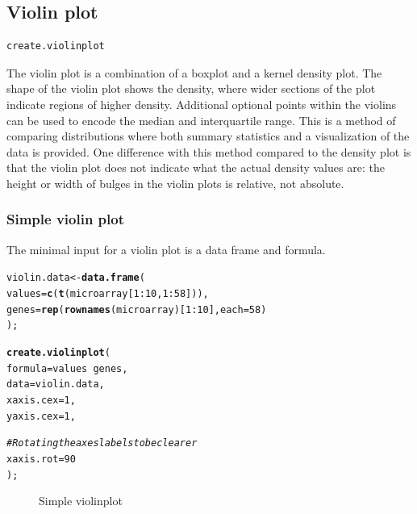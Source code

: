 \documentclass[letterpaper]{article}\usepackage[]{graphicx}\usepackage[]{color}
\makeatletter
\newcommand{\hlnum}[1]{\textcolor[rgb]{0.686,0.059,0.569}{#1}}%
\newcommand{\hlcom}[1]{\textcolor[rgb]{0.678,0.584,0.686}{\textit{#1}}}%
\newcommand{\hlopt}[1]{\textcolor[rgb]{0,0,0}{#1}}%
\newcommand{\hlstd}[1]{\textcolor[rgb]{0.345,0.345,0.345}{#1}}%
\newcommand{\hlkwb}[1]{\textcolor[rgb]{0.69,0.353,0.396}{#1}}%
\newcommand{\hlkwc}[1]{\textcolor[rgb]{0.333,0.667,0.333}{#1}}%
\newcommand{\hlkwd}[1]{\textcolor[rgb]{0.737,0.353,0.396}{\textbf{#1}}}%
\newenvironment{kframe}{%
 \def\at@end@of@kframe{}%
 \ifinner\ifhmode%
  \def\at@end@of@kframe{\end{minipage}}%
  \begin{minipage}{\columnwidth}%
 \fi\fi%
 \def\FrameCommand##1{\hskip\@totalleftmargin \hskip-\fboxsep
 \colorbox{shadecolor}{##1}\hskip-\fboxsep
     \hskip-\linewidth \hskip-\@totalleftmargin \hskip\columnwidth}%
 \MakeFramed {\advance\hsize-\width
   \@totalleftmargin\z@ \linewidth\hsize
   \@setminipage}}%
 {\par\unskip\endMakeFramed%
 \at@end@of@kframe}
\newenvironment{knitrout}{}{} %
\makeatother
\begin{document}
\subsection{Violin plot}
\begin{verbatim}
create.violinplot
\end{verbatim}

The violin plot is a combination of a boxplot and a kernel density plot. The shape of the violin plot shows the density, where wider sections of the plot indicate regions of higher density. Additional optional points within the violins can be used to encode the median and interquartile range. This is a method of comparing distributions where both summary statistics and a visualization of the data is provided. One difference with this method compared to the density plot is that the violin plot does not indicate what the actual density values are: the height or width of bulges in the violin plots is relative, not absolute.

\subsubsection{Simple violin plot}
The minimal input for a violin plot is a data frame and formula.
\begin{knitrout}
\color{fgcolor}\begin{kframe}
\begin{alltt}
\hlstd{violin.data} \hlkwb{<-} \hlkwd{data.frame}\hlstd{(}
    \hlkwc{values} \hlstd{=} \hlkwd{c}\hlstd{(}\hlkwd{t}\hlstd{(microarray[}\hlnum{1}\hlopt{:}\hlnum{10}\hlstd{,} \hlnum{1}\hlopt{:}\hlnum{58}\hlstd{])),}
    \hlkwc{genes} \hlstd{=} \hlkwd{rep}\hlstd{(}\hlkwd{rownames}\hlstd{(microarray)[}\hlnum{1}\hlopt{:}\hlnum{10}\hlstd{],} \hlkwc{each} \hlstd{=} \hlnum{58}\hlstd{)}
    \hlstd{);}

\hlkwd{create.violinplot}\hlstd{(}
    \hlkwc{formula} \hlstd{= values} \hlopt{~} \hlstd{genes,}
    \hlkwc{data} \hlstd{= violin.data,}
        \hlkwc{xaxis.cex} \hlstd{=} \hlnum{1}\hlstd{,}
        \hlkwc{yaxis.cex} \hlstd{=} \hlnum{1}\hlstd{,}

    \hlcom{# Rotating the axes labels to be clearer}
    \hlkwc{xaxis.rot} \hlstd{=} \hlnum{90}
    \hlstd{);}
\end{alltt}
\end{kframe}\begin{figure}[]


{\centering {} 

}

\caption[Simple violinplot]{Simple violinplot\label{fig:violinplot}}
\end{figure}


\end{knitrout}
\end{document}
